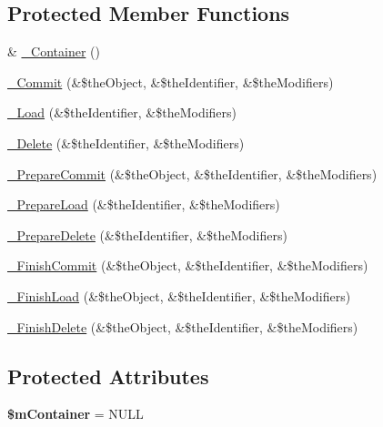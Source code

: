 \subsection*{Protected Member Functions}
\begin{DoxyCompactItemize}
\item 
\& \hyperlink{class_c_container_a4794d326f4ffd3c2b8afd2e0460604ff}{\-\_\-\-Container} ()
\item 
\hyperlink{class_c_container_acbc85dd164615b31c9edfec93bcf27f9}{\-\_\-\-Commit} (\&\$the\-Object, \&\$the\-Identifier, \&\$the\-Modifiers)
\item 
\hyperlink{class_c_container_a865f140560991fa21a88b7fc8ff8f1f5}{\-\_\-\-Load} (\&\$the\-Identifier, \&\$the\-Modifiers)
\item 
\hyperlink{class_c_container_a20aac3eec154c2122f2c602bf5ce35fe}{\-\_\-\-Delete} (\&\$the\-Identifier, \&\$the\-Modifiers)
\item 
\hyperlink{class_c_container_a0dc47e54abc533cedf1c2c0f915d96b2}{\-\_\-\-Prepare\-Commit} (\&\$the\-Object, \&\$the\-Identifier, \&\$the\-Modifiers)
\item 
\hyperlink{class_c_container_a1b84868c32fcfd3e11a9f6cc85fc461c}{\-\_\-\-Prepare\-Load} (\&\$the\-Identifier, \&\$the\-Modifiers)
\item 
\hyperlink{class_c_container_a238776ec6152dd400be2ed87ba949fd0}{\-\_\-\-Prepare\-Delete} (\&\$the\-Identifier, \&\$the\-Modifiers)
\item 
\hyperlink{class_c_container_a4c9cae709a81dd53c7307bfbde891fae}{\-\_\-\-Finish\-Commit} (\&\$the\-Object, \&\$the\-Identifier, \&\$the\-Modifiers)
\item 
\hyperlink{class_c_container_ab53bd683f0e28b2203897cf03f9d1c76}{\-\_\-\-Finish\-Load} (\&\$the\-Object, \&\$the\-Identifier, \&\$the\-Modifiers)
\item 
\hyperlink{class_c_container_ab8bfc9866573dd474dcf418059d94fbe}{\-\_\-\-Finish\-Delete} (\&\$the\-Object, \&\$the\-Identifier, \&\$the\-Modifiers)
\end{DoxyCompactItemize}
\subsection*{Protected Attributes}
\begin{DoxyCompactItemize}
\item 
\hypertarget{class_c_container_a52a8e4284fff9530c1ff25c93b238b9f}{{\bfseries \$m\-Container} = N\-U\-L\-L}\label{class_c_container_a52a8e4284fff9530c1ff25c93b238b9f}

\end{DoxyCompactItemize}
